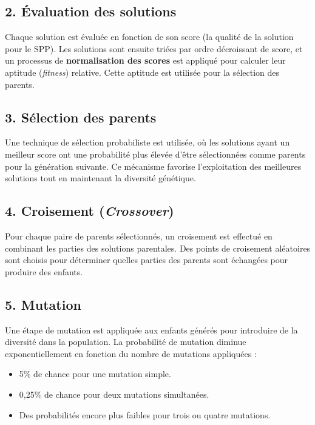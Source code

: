 \begin{minipage}
\subsection*{2. Évaluation des solutions}

Chaque solution est évaluée en fonction de son score (la qualité de la solution pour le SPP). Les solutions sont ensuite triées par ordre décroissant de score, et un processus de \textbf{normalisation des scores} est appliqué pour calculer leur aptitude (\textit{fitness}) relative. Cette aptitude est utilisée pour la sélection des parents.

\subsection*{3. Sélection des parents}

Une technique de sélection probabiliste est utilisée, où les solutions ayant un meilleur score ont une probabilité plus élevée d'être sélectionnées comme parents pour la génération suivante. Ce mécanisme favorise l'exploitation des meilleures solutions tout en maintenant la diversité génétique.

\subsection*{4. Croisement (\textit{Crossover})}

Pour chaque paire de parents sélectionnés, un croisement est effectué en combinant les parties des solutions parentales. Des points de croisement aléatoires sont choisis pour déterminer quelles parties des parents sont échangées pour produire des enfants.

\subsection*{5. Mutation}

Une étape de mutation est appliquée aux enfants générés pour introduire de la diversité dans la population. La probabilité de mutation diminue exponentiellement en fonction du nombre de mutations appliquées :
\begin{itemize}
    \item 5\% de chance pour une mutation simple.
    \item 0,25\% de chance pour deux mutations simultanées.
    \item Des probabilités encore plus faibles pour trois ou quatre mutations.
\end{itemize}


\end{minipage}
